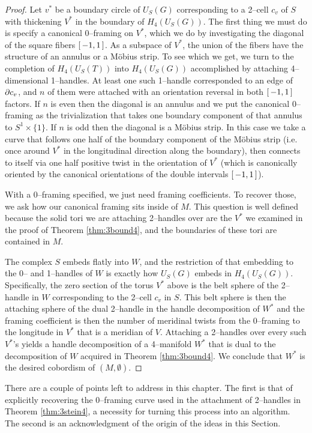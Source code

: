\begin{proof}
	Let $v^*$ be a boundary circle of $U_S(G)$ corresponding to a 2--cell $c_v$ of $S$ with thickening $V^*$ in the boundary of $H_4(U_S(G))$.
	The first thing we must do is specify a canonical 0--framing on $V^*$, which we do by investigating the diagonal of the square fibers $[\,-1,1\,]$.
	As a subspace of $V^*$, the union of the fibers have the structure of an annulus or a M\"obius strip.
	To see which we get, we turn to the completion of $H_4(U_S(T))$ into $H_4(U_S(G))$ accomplished by attaching 4--dimensional 1--handles.
	At least one such 1--handle corresponded to an edge of $\partial c_v$, and $n$ of them were attached with an orientation reversal in both $[\,-1,1\,]$ factors.
	If $n$ is even then the diagonal is an annulus and we put the canonical 0--framing as the trivialization that takes one boundary component of that annulus to $S^1\times\{1\}$.
	If $n$ is odd then the diagonal is a M\"obius strip.
	In this case we take a curve that follows one half of the boundary component of the M\"obius strip (i.e. once around $V^*$ in the longitudinal direction along the boundary), then connects to itself via one half positive twist in the orientation of $V^*$ (which is canonically oriented by the canonical orientations of the double intervals $[\,-1,1\,]$).
	
	With a 0--framing specified, we just need framing coefficients.
	To recover those, we ask how our canonical framing sits inside of $M$.
	This question is well defined because the solid tori we are attaching 2--handles over are the $V^*$ we examined in the proof of Theorem \ref{thm:3bound4}, and the boundaries of these tori are contained in $M$.
	
	The complex $S$ embeds flatly into $W$, and the restriction of that embedding to the 0-- and 1--handles of $W$ is exactly how $U_S(G)$ embeds in $H_4(U_S(G))$.
	Specifically, the zero section of the torus $V^*$ above is the belt sphere of the 2--handle in $W$ corresponding to the 2--cell $c_v$ in $S$.
	This belt sphere is then the attaching sphere of the dual 2--handle in the handle decomposition of $W^*$ and the framing coefficient is then the number of meridinal twists from the 0--framing to the longitude in $V^*$ that is a meridian of $V$.
	Attaching a 2--handles over every such $V^*$'s yields a handle decomposition of a 4--manifold $W^*$ that is dual to the decomposition of $W$ acquired in Theorem \ref{thm:3bound4}.
	We conclude that $W^*$ is the desired cobordism of $(M,\emptyset)$.
\end{proof}

There are a couple of points left to address in this chapter.
The first is that of explicitly recovering the 0--framing curve used in the attachment of 2--handles in Theorem \ref{thm:3stein4}, a necessity for turning this process into an algorithm.
The second is an acknowledgment of the origin of the ideas in this Section.

